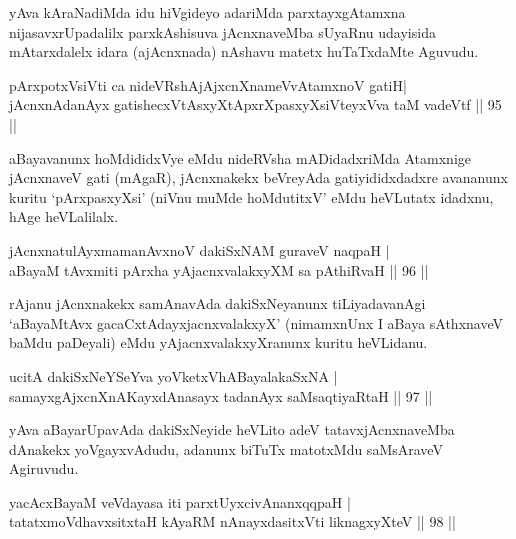 \begin{artha}
yAva kAraNadiMda idu hiVgideyo adariMda parxtayxgAtamxna nijasavxrUpadalilx parxkAshisuva jAcnxnaveMba sUyaRnu udayisida mAtarxdalelx idara (ajAcnxnada) nAshavu matetx huTaTxdaMte Aguvudu.
\end{artha}


\begin{shl}
pArxpotxV\s siVti ca nideVRshAjAjxcnXnameVvA\s \s tamxnoV gatiH|\\
jAcnxnAdanAyx gatishecxVtAsxyXtApxrXpasxyXsiVteyxVva taM vadeVtf \hfill || 95 || 
\end{shl}

\begin{artha}
aBayavanunx hoMdididxVye eMdu nideRVsha mADidadxriMda Atamxnige jAcnxnaveV gati (mAgaR), jAcnxnakekx beVreyAda gatiyididxdadxre avananunx kuritu `pArxpasxyXsi' (niVnu muMde hoMdutitxV' eMdu heVLutatx idadxnu, hAge heVLalilalx.
\end{artha}

\begin{shl}
jAcnxnatulAyxmamanAvxnoV dakiSxNAM guraveV naqpaH |\\
aBayaM tAvxmiti pArxha yAjacnxvalakxyXM sa pAthiRvaH \hfill || 96 || 
\end{shl}

\begin{artha}
rAjanu jAcnxnakekx samAnavAda dakiSxNeyanunx tiLiyadavanAgi `aBayaMtAvx gacaCxtAdayxjacnxvalakxyX' (nimamxnUnx I aBaya sAthxnaveV baMdu paDeyali) eMdu yAjacnxvalakxyXranunx kuritu heVLidanu.
\end{artha}

\begin{shl}
ucitA dakiSxNeYSeYva yoVketxVhABayalakaSxNA |\\
samayxgAjxcnXnAKayxdAnasayx tadanAyx saMsaqtiyaRtaH \hfill || 97 || 
\end{shl}

\begin{artha}
yAva aBayarUpavAda dakiSxNeyide heVLito adeV tatavxjAcnxnaveMba dAnakekx yoVgayxvAdudu, adanunx biTuTx matotxMdu saMsAraveV Agiruvudu.
\end{artha}


\begin{shl}
yacAcxBayaM veVdayasa iti parxtUyxcivAnanxqqpaH |\\
tatatxmoVdhavxsitxtaH kAyaRM nAnayxdasitxVti liknagxyXteV \hfill || 98 || 
\end{shl}

